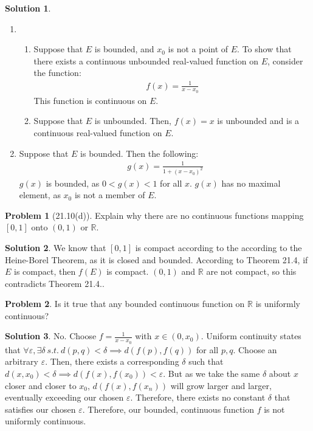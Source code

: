 \documentclass[12pt]{article}
\theoremstyle{definition} %
\newtheorem{solution}{Solution}
\newtheorem{problem}{Problem}
\theoremstyle{plain} %
\begin{document}
\begin{solution}
 \begin{enumerate}
  \item \begin{enumerate}
    \item Suppose that $E$ is bounded, and $x_0$ is not a point of $E$. To show that there exists a continuous unbounded real-valued function on $E$, consider the function:
    \begin{align}
     f(x)=\frac{1}{x-x_0}
    \end{align} 
    This function is continuous on $E$.
    \item Suppose that $E$ is unbounded. Then, $f(x)=x$ is unbounded and is a continuous real-valued function on $E$. 
  \end{enumerate}
  \item Suppose that $E$ is bounded. Then the following:
  \begin{align}
    g(x)=\frac{1}{1+(x-x_0)^{2}}
  \end{align}
$g(x)$ is bounded, as $0<g(x)<1$ for all $x$. $g(x)$ has no maximal element, as $x_0$ is not a member of $E$. 
 \end{enumerate} 
\end{solution}
\begin{problem}[21.10(d)]
    Explain why there are no continuous functions mapping $[0,1]$ onto $(0,1)$ or $\mathbb{R}$.
\end{problem}
\begin{solution}
  We know that $[0,1]$ is compact according to the according to the Heine-Borel Theorem, as it is closed and bounded. According to Theorem 21.4, if $E$ is compact, then $f(E)$ is compact. $(0,1)$ and $\mathbb{R}$ are not compact, so this contradicts Theorem 21.4..
\end{solution}
\begin{problem}
  Is it true that any bounded continuous function on $\mathbb{R}$ is uniformly continuous? 
\end{problem}
\begin{solution}
  No. Choose $f=\frac{1}{x-x_0}$ with $x\in (0,x_0)$. Uniform continuity states that $\forall \varepsilon, \exists \delta \ s.t. \ d(p,q)<\delta \implies d(f(p),f(q))$ for all $p, q$. Choose an arbitrary $\varepsilon$. Then, there exists a corresponding $\delta$ such that $d(x,x_0)<\delta\implies d(f(x),f(x_0))<\varepsilon$. But as we take the same $\delta$ about $x$ closer and closer to $x_0$, $d(f(x),f(x_n))$ will grow larger and larger, eventually exceeding our chosen $\varepsilon$. Therefore, there exists no constant $\delta$ that satisfies our chosen $\varepsilon$. Therefore, our bounded, continuous function $f$ is not uniformly continuous.    
\end{solution}
\end{document}
